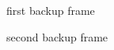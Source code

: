 \begin{frame}
    first backup frame
\end{frame}

\begin{frame}
    second backup frame
\end{frame}
